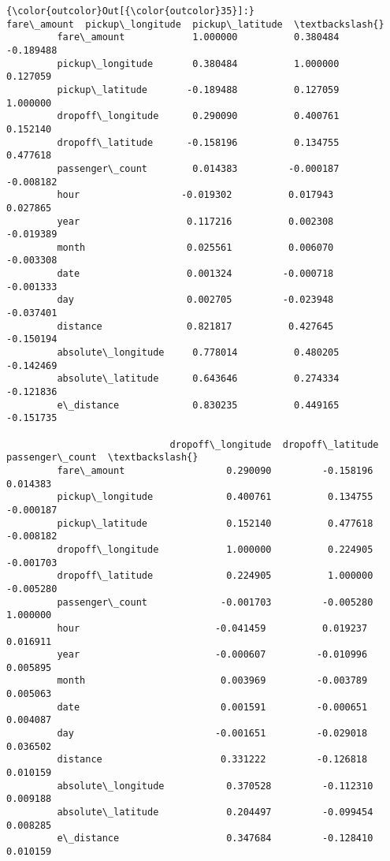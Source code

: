 \documentclass[11pt]{article}
\begin{document}
\begin{Verbatim}[commandchars=\\\{\}]
{\color{outcolor}Out[{\color{outcolor}35}]:}                     fare\_amount  pickup\_longitude  pickup\_latitude  \textbackslash{}
         fare\_amount            1.000000          0.380484        -0.189488   
         pickup\_longitude       0.380484          1.000000         0.127059   
         pickup\_latitude       -0.189488          0.127059         1.000000   
         dropoff\_longitude      0.290090          0.400761         0.152140   
         dropoff\_latitude      -0.158196          0.134755         0.477618   
         passenger\_count        0.014383         -0.000187        -0.008182   
         hour                  -0.019302          0.017943         0.027865   
         year                   0.117216          0.002308        -0.019389   
         month                  0.025561          0.006070        -0.003308   
         date                   0.001324         -0.000718        -0.001333   
         day                    0.002705         -0.023948        -0.037401   
         distance               0.821817          0.427645        -0.150194   
         absolute\_longitude     0.778014          0.480205        -0.142469   
         absolute\_latitude      0.643646          0.274334        -0.121836   
         e\_distance             0.830235          0.449165        -0.151735   
         
                             dropoff\_longitude  dropoff\_latitude  passenger\_count  \textbackslash{}
         fare\_amount                  0.290090         -0.158196         0.014383   
         pickup\_longitude             0.400761          0.134755        -0.000187   
         pickup\_latitude              0.152140          0.477618        -0.008182   
         dropoff\_longitude            1.000000          0.224905        -0.001703   
         dropoff\_latitude             0.224905          1.000000        -0.005280   
         passenger\_count             -0.001703         -0.005280         1.000000   
         hour                        -0.041459          0.019237         0.016911   
         year                        -0.000607         -0.010996         0.005895   
         month                        0.003969         -0.003789         0.005063   
         date                         0.001591         -0.000651         0.004087   
         day                         -0.001651         -0.029018         0.036502   
         distance                     0.331222         -0.126818         0.010159   
         absolute\_longitude           0.370528         -0.112310         0.009188   
         absolute\_latitude            0.204497         -0.099454         0.008285   
         e\_distance                   0.347684         -0.128410         0.010159   
         

\end{Verbatim}
\end{document}
